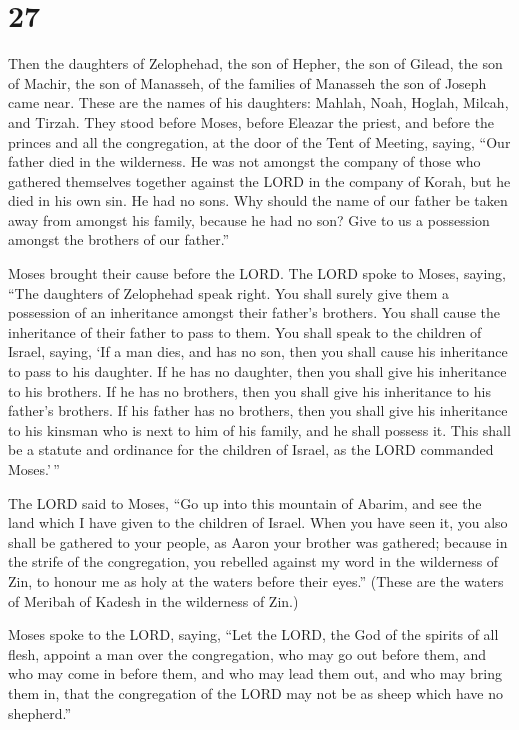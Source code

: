 \hypertarget{section-26}{%
\section{27}\label{section-26}}

 Then the daughters of Zelophehad, the son of Hepher, the
son of Gilead, the son of Machir, the son of Manasseh, of the families
of Manasseh the son of Joseph came near. These are the names of his
daughters: Mahlah, Noah, Hoglah, Milcah, and Tirzah.  They
stood before Moses, before Eleazar the priest, and before the princes
and all the congregation, at the door of the Tent of Meeting, saying,
 ``Our father died in the wilderness. He was not amongst the
company of those who gathered themselves together against the LORD in
the company of Korah, but he died in his own sin. He had no sons.
 Why should the name of our father be taken away from
amongst his family, because he had no son? Give to us a possession
amongst the brothers of our father.''

 Moses brought their cause before the LORD.  The
LORD spoke to Moses, saying,  ``The daughters of Zelophehad
speak right. You shall surely give them a possession of an inheritance
amongst their father's brothers. You shall cause the inheritance of
their father to pass to them.  You shall speak to the
children of Israel, saying, `If a man dies, and has no son, then you
shall cause his inheritance to pass to his daughter.  If he
has no daughter, then you shall give his inheritance to his brothers.
 If he has no brothers, then you shall give his inheritance
to his father's brothers.  If his father has no brothers,
then you shall give his inheritance to his kinsman who is next to him of
his family, and he shall possess it. This shall be a statute and
ordinance for the children of Israel, as the LORD commanded Moses.'\,''

 The LORD said to Moses, ``Go up into this mountain of
Abarim, and see the land which I have given to the children of Israel.
 When you have seen it, you also shall be gathered to your
people, as Aaron your brother was gathered;  because in the
strife of the congregation, you rebelled against my word in the
wilderness of Zin, to honour me as holy at the waters before their
eyes.'' (These are the waters of Meribah of Kadesh in the wilderness of
Zin.)

 Moses spoke to the LORD, saying,  ``Let the
LORD, the God of the spirits of all flesh, appoint a man over the
congregation,  who may go out before them, and who may come
in before them, and who may lead them out, and who may bring them in,
that the congregation of the LORD may not be as sheep which have no
shepherd.''

